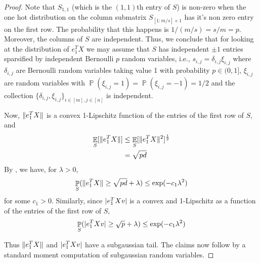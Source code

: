 \documentclass[11pt]{amsart}
\numberwithin{equation}{section}
\numberwithin{equation}{section}
\DeclareMathOperator{\E}{\mathbb{E}}
\DeclareMathOperator{\Pb}{\mathbb{P}}
\DeclarePairedDelimiter{\norm}{\lVert}{\rVert}
\DeclarePairedDelimiter{\abs}{\lvert}{\rvert}
\begin{document}
\begin{proof}
Note that $S_{1,1}$ (which is the $(1,1)$th entry of $S$) is non-zero when the one hot distribution on the column submatrix $S_{[1:m/s]\times{1}}$ has it's non zero entry on the first row. The probability that this happens is $1/(m/s) = s/m = p$. Moreover, the columns of $S$ are independent. Thus, we conclude that for looking at the distribution of $e_{1}^TX$ we may assume that $S$ has independent 
$\pm 1$ entries sparsified by independent Bernoulli $p$ random variables, i.e., $s_{i,j}=\delta_{i,j} \xi_{i,j}$ where $\delta_{i,j}$ are Bernoulli random variables taking value 1 with probability $p \in (0,1]$, $\xi_{i,j}$ are random variables with $\Pb(\xi_{i,j}=1)=\Pb(\xi_{i,j}=-1)=1/2$ and the collection $\{\delta_{i,j}, \xi_{i,j} \}_{i \in [m], j \in [n]}$ is independent.


Now, $\norm{e_{1}^TX}$ is a convex 1-Lipschitz function of the entries of  the first row of $S$, and
\begin{align*}
    \E_S[\norm{e_{1}^TX}] &\le  \E_S[\norm{e_{1}^TX}^2]^\frac{1}{2} \\
    &= \sqrt{ pd}
\end{align*}
By \cite[Theorem 6.10]{boucheron2013concentration}, we have, for $\lambda > 0$,
\begin{align*}
    \Pb_{S} ( \norm{e_{1}^TX} \ge \sqrt{ pd } + \lambda ) \le \exp(-c_1\lambda^2)
\end{align*}
for some $c_1>0$. Similarly, since $\abs{e_{1}^TXv}$ is a convex and 1-Lipschitz as a function of the entries of the first row of $S$, 
\begin{align*}
    \Pb_{S} ( \abs{e_{1}^TXv} \ge \sqrt{ p } + \lambda ) \le \exp(-c_1\lambda^2)
\end{align*}

Thus $\norm{e_{1}^TX}$ and $\abs{e_{1}^TXv}$ have a subgaussian tail. The claims now follow by a standard moment computation of subgaussian random variables.

\end{proof}
\end{document}
